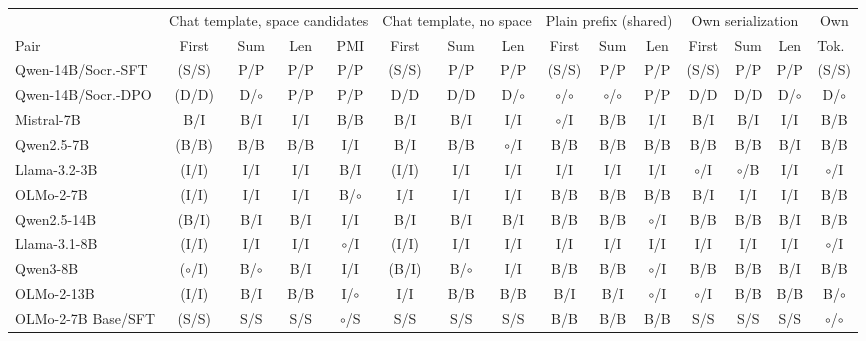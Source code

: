 \begin{table}[t]
\centering\scriptsize
\setlength{\tabcolsep}{3.2pt}
\begin{tabular}{@{}lcccc@{\hspace{5pt}}ccc@{\hspace{5pt}}ccc@{\hspace{5pt}}ccc@{\hspace{5pt}}c@{}}
\toprule
& \multicolumn{4}{c}{Chat template, space candidates} & \multicolumn{3}{c}{Chat template, no space} & \multicolumn{3}{c}{Plain prefix (shared)} & \multicolumn{3}{c}{Own serialization} & Own \\
\cmidrule(lr){2-5}\cmidrule(lr){6-8}\cmidrule(lr){9-11}\cmidrule(lr){12-14}\cmidrule(l){15-15}
Pair & First & Sum & Len & PMI & First & Sum & Len & First & Sum & Len & First & Sum & Len & Tok.\ \\
\midrule
Qwen-14B/Socr.-SFT & (S/S) & P/P & P/P & P/P & (S/S) & P/P & P/P & (S/S) & P/P & P/P & (S/S) & P/P & P/P & (S/S) \\
Qwen-14B/Socr.-DPO & (D/D) & D/$\circ$ & P/P & P/P & D/D & D/D & D/$\circ$ & $\circ$/$\circ$ & $\circ$/$\circ$ & P/P & D/D & D/D & D/$\circ$ & D/$\circ$ \\
\addlinespace[2pt]
Mistral-7B & B/I & B/I & I/I & B/B & B/I & B/I & I/I & $\circ$/I & B/B & I/I & B/I & B/I & I/I & B/B \\
Qwen2.5-7B & (B/B) & B/B & B/B & I/I & B/I & B/B & $\circ$/I & B/B & B/B & B/B & B/B & B/B & B/I & B/B \\
Llama-3.2-3B & (I/I) & I/I & I/I & B/I & (I/I) & I/I & I/I & I/I & I/I & I/I & $\circ$/I & $\circ$/B & I/I & $\circ$/I \\
OLMo-2-7B & (I/I) & I/I & I/I & B/$\circ$ & I/I & I/I & I/I & B/B & B/B & B/B & B/I & I/I & I/I & B/B \\
\addlinespace[2pt]
Qwen2.5-14B & (B/I) & B/I & B/I & I/I & B/I & B/I & B/I & B/B & B/B & $\circ$/I & B/B & B/B & B/I & B/B \\
Llama-3.1-8B & (I/I) & I/I & I/I & $\circ$/I & (I/I) & I/I & I/I & I/I & I/I & I/I & I/I & I/I & I/I & $\circ$/I \\
Qwen3-8B & ($\circ$/I) & B/$\circ$ & B/I & I/I & (B/I) & B/$\circ$ & I/I & B/B & B/B & $\circ$/I & B/B & B/B & B/I & B/B \\
OLMo-2-13B & (I/I) & B/I & B/B & I/$\circ$ & I/I & B/B & B/B & B/I & B/I & $\circ$/I & $\circ$/I & B/B & B/B & B/$\circ$ \\
\addlinespace[2pt]
OLMo-2-7B Base/SFT & (S/S) & S/S & S/S & $\circ$/S & S/S & S/S & S/S & B/B & B/B & B/B & S/S & S/S & S/S & $\circ$/$\circ$ \\

\end{tabular}
\end{table}

